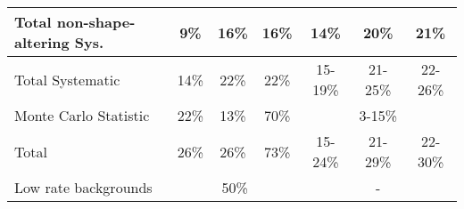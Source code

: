 \begin{table}[!htb]
\begin{center}
{\begin{tabular}{|l|ccc|ccc|}
Total non-shape-altering Sys. & 9\% & 16\% & 16\% & 14\% &20\%& 21\% \\\hline
Total Systematic&  14\% & 22\%  & 22\%& 15-19\% & 21-25\%  & 22-26\%\\\hline
Monte Carlo Statistic & 22\% & 13\% & 70\% & \multicolumn{3}{c|}{3-15\%} \\\hline
Total& 26\% & 26\%  & 73\%& 15-24\% & 21-29\%  & 22-30\%\\\hline
Low rate backgrounds &\multicolumn{3}{c|}{50\%}&\multicolumn{3}{c|}{-}\\\hline
\hline
\end{tabular}
}
\label{Tab.SYS}
\end{center}
\end{table}
